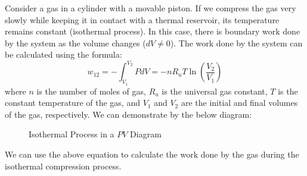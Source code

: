 \documentclass[11pt]{report}
\begin{document}
\begin{example}
    Consider a gas in a cylinder with a movable piston. If we compress the gas very slowly while keeping it in contact with a thermal reservoir, its temperature remains constant (isothermal process). In this case, there is boundary work done by the system as the volume changes ($dV \neq 0$). The work done by the system can be calculated using the formula:
    \begin{equation}
        w_{12} = -\int_{V_1}^{V_2} P dV = -nR_u T \ln\left(\frac{V_2}{V_1}\right)
    \end{equation}
    where $n$ is the number of moles of gas, $R_u$ is the universal gas constant, $T$ is the constant temperature of the gas, and $V_1$ and $V_2$ are the initial and final volumes of the gas, respectively. We can demonstrate by the below diagram:
    \begin{figure}[h!]
        \centering
        \caption{Isothermal Process in a $PV$ Diagram}
    \end{figure}

    We can use the above equation to calculate the work done by the gas during the isothermal compression process.
    
\end{example}
\end{document}
